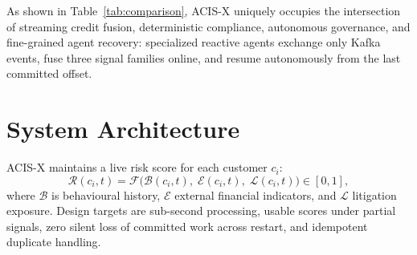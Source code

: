 \documentclass[runningheads]{llncs}
\begin{document}
\begin{table}[htbp]
\caption{Architectural positioning across enterprise credit risk paradigms}
\label{tab:comparison}
\centering\scriptsize
{}
\end{table}

As shown in Table~\ref{tab:comparison}, ACIS-X uniquely occupies the intersection of streaming credit fusion, deterministic compliance, autonomous governance, and fine-grained agent recovery: specialized reactive agents exchange only Kafka events, fuse three signal families online, and resume autonomously from the last committed offset.

\section{System Architecture}
\label{sec:architecture}

ACIS-X maintains a live risk score for each customer $c_i$:
\begin{equation}
\mathcal{R}(c_i,t) = \mathcal{F}\bigl(\mathcal{B}(c_i,t),\;\mathcal{E}(c_i,t),\;\mathcal{L}(c_i,t)\bigr) \in [0,1],
\label{eq:risk}
\end{equation}
where $\mathcal{B}$ is behavioural history, $\mathcal{E}$ external financial indicators, and $\mathcal{L}$ litigation exposure. Design targets are sub-second processing, usable scores under partial signals, zero silent loss of committed work across restart, and idempotent duplicate handling.
\end{document}
